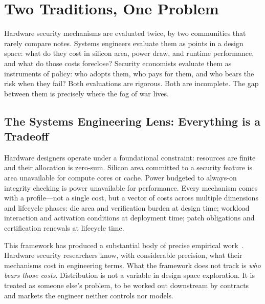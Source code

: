 \section{Two Traditions, One Problem}
\label{sec:traditions}

Hardware security mechanisms are evaluated twice, by two communities that
rarely compare notes. Systems engineers evaluate them as points in a design
space: what do they cost in silicon area, power draw, and runtime performance,
and what do those costs foreclose? Security economists evaluate them as
instruments of policy: who adopts them, who pays for them, and who bears the
risk when they fail? Both evaluations are rigorous. Both are incomplete. The
gap between them is precisely where the fog of war lives.

\subsection{The Systems Engineering Lens: Everything is a Tradeoff}
\label{sec:engineering}

Hardware designers operate under a foundational constraint: resources are
finite and their allocation is zero-sum. Silicon area committed to a security
feature is area unavailable for compute cores or cache. Power budgeted to
always-on integrity checking is power unavailable for performance. Every
mechanism comes with a profile---not a single cost, but a vector of costs
across multiple dimensions and lifecycle phases: die area and verification
burden at design time; workload interaction and activation conditions at
deployment time; patch obligations and certification renewals at lifecycle time.

This framework has produced a substantial body of precise empirical
work~\cite{costan2016sanctum,tsai2017graphenesgx,koruyeh2022retbleed,yan2018invisispec,arm2021mte,woodruff2014cheri}.
Hardware security researchers know, with considerable precision, what their
mechanisms cost in engineering terms. What the framework does not track is
\emph{who bears those costs}. Distribution is not a variable in design space
exploration. It is treated as someone else's problem, to be worked out
downstream by contracts and markets the engineer neither controls nor models.

